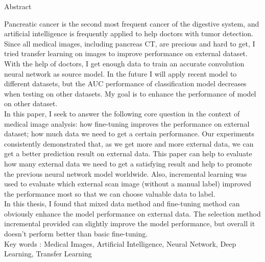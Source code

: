 


\doublespacing
{}
\begin{center}
\Large{{Abstract}}\\
\end{center}
Pancreatic cancer is the second most frequent cancer of the digestive system, and artificial intelligence is frequently applied to help doctors with tumor detection. \\

Since all medical images, including pancreas CT, are precious and hard to get, I tried transfer learning on images to improve performance on external dataset. With the help of doctors, I get enough data to train an accurate convolution neural network as source model. In the future I will apply recent model to different datasets, but the AUC performance of classification model decreases when testing on other datasets. My goal is to enhance the performance of model on other dataset. \\

In this paper, I seek to answer the following core question in the context of medical image analysis: how fine-tuning improves the performance on external dataset; how much data we need to get a certain performance. Our experiments consistently demonstrated that, as we get more and more external data, we can get a better prediction result on external data. This paper can help to evaluate how many external data we need to get a satisfying result and help to promote the previous neural network model worldwide. Also, incremental learning was used to evaluate which external scan image (without a manual label) improved the performance most so that we can choose valuable data to label. \\

In this thesis, I found that mixed data method and fine-tuning method can obviously enhance the model performance on external data. The selection method incremental provided can slightly improve the model performance, but overall it doesn't perform better than basic fine-tuning. \\

Key words : Medical Images, Artificial Intelligence, Neural Network, Deep Learning, Transfer Learning

